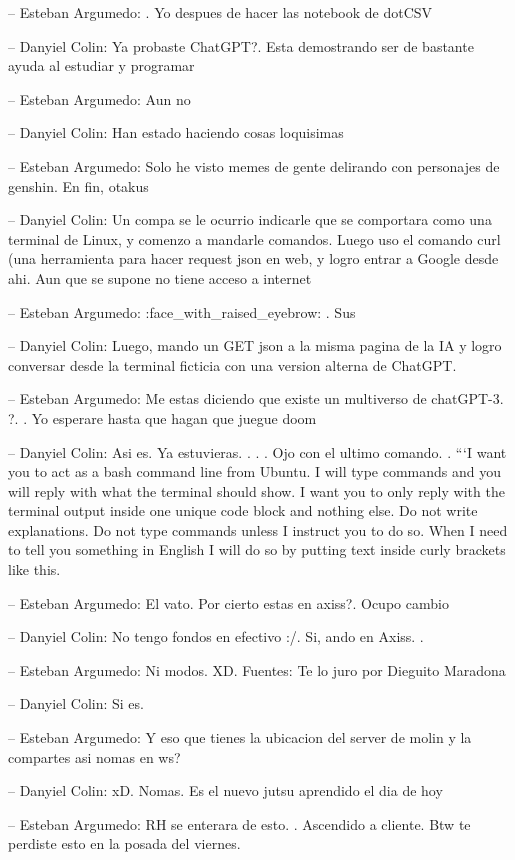 -- Esteban Argumedo: . Yo despues de hacer las notebook de dotCSV

-- Danyiel Colin: Ya probaste ChatGPT?. Esta demostrando ser de bastante
ayuda al estudiar y programar

-- Esteban Argumedo: Aun no

-- Danyiel Colin: Han estado haciendo cosas loquisimas

-- Esteban Argumedo: Solo he visto memes de gente delirando con
personajes de genshin. En fin, otakus

-- Danyiel Colin: Un compa se le ocurrio indicarle que se comportara
como una terminal de Linux, y comenzo a mandarle comandos. Luego uso el
comando curl (una herramienta para hacer request json en web, y logro
entrar a Google desde ahi. Aun que se supone no tiene acceso a internet

-- Esteban Argumedo: :face\_with\_raised\_eyebrow: . Sus

-- Danyiel Colin: Luego, mando un GET json a la misma pagina de la IA y
logro conversar desde la terminal ficticia con una version alterna de
ChatGPT.

-- Esteban Argumedo: Me estas diciendo que existe un multiverso de
chatGPT-3. ?. . Yo esperare hasta que hagan que juegue doom

-- Danyiel Colin: Asi es. Ya estuvieras. . . . Ojo con el ultimo
comando. . ```I want you to act as a bash command line from Ubuntu. I
will type commands and you will reply with what the terminal should
show. I want you to only reply with the terminal output inside one
unique code block and nothing else. Do not write explanations. Do not
type commands unless I instruct you to do so. When I need to tell you
something in English I will do so by putting text inside curly brackets
like this.

-- Esteban Argumedo: El vato. Por cierto estas en axiss?. Ocupo cambio

-- Danyiel Colin: No tengo fondos en efectivo :/. Si, ando en Axiss. .

-- Esteban Argumedo: Ni modos. XD. Fuentes: Te lo juro por Dieguito
Maradona

-- Danyiel Colin: Si es.

-- Esteban Argumedo: Y eso que tienes la ubicacion del server de molin y
la compartes asi nomas en ws?

-- Danyiel Colin: xD. Nomas. Es el nuevo jutsu aprendido el dia de hoy

-- Esteban Argumedo: RH se enterara de esto. . Ascendido a cliente. Btw
te perdiste esto en la posada del viernes.

